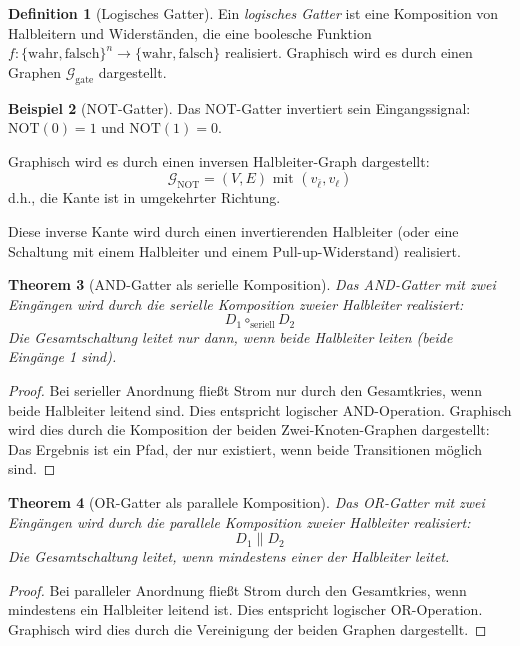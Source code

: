 \documentclass[12pt, a4paper]{article}
\newtheorem{theorem}{Theorem}[section]
\theoremstyle{definition}
\newtheorem{definition}[theorem]{Definition}
\newtheorem{example}[theorem]{Beispiel}
\theoremstyle{remark}
\newcommand{\Bool}{\{\mathrm{wahr}, \mathrm{falsch}\}}
\newcommand{\Graph}{\mathcal{G}}
\newcommand{\leit}{\ell}
\newcommand{\sperr}{\bar{\ell}}
\begin{document}
\begin{definition}[Logisches Gatter]
\label{def:logisches_gatter}
Ein \emph{logisches Gatter} ist eine Komposition von Halbleitern und Widerständen, die eine boolesche Funktion $f: \Bool^n \to \Bool$ realisiert. Graphisch wird es durch einen Graphen $\Graph_{\mathrm{gate}}$ dargestellt.
\end{definition}

\begin{example}[NOT-Gatter]
\label{ex:not_gatter}
Das NOT-Gatter invertiert sein Eingangssignal: $\mathrm{NOT}(0) = 1$ und $\mathrm{NOT}(1) = 0$.

Graphisch wird es durch einen inversen Halbleiter-Graph dargestellt:
\[
  \Graph_{\mathrm{NOT}} = (V, E) \text{ mit } (v_{\sperr}, v_{\leit})
\]
d.h., die Kante ist in umgekehrter Richtung.

Diese inverse Kante wird durch einen invertierenden Halbleiter (oder eine Schaltung mit einem Halbleiter und einem Pull-up-Widerstand) realisiert.
\end{example}

\begin{theorem}[AND-Gatter als serielle Komposition]
\label{thm:and_gatter}
Das AND-Gatter mit zwei Eingängen wird durch die serielle Komposition zweier Halbleiter realisiert:
\[
  D_1 \circ_{\mathrm{seriell}} D_2
\]
Die Gesamtschaltung leitet nur dann, wenn beide Halbleiter leiten (beide Eingänge 1 sind).
\end{theorem}

\begin{proof}
Bei serieller Anordnung fließt Strom nur durch den Gesamtkries, wenn beide Halbleiter leitend sind. Dies entspricht logischer AND-Operation. Graphisch wird dies durch die Komposition der beiden Zwei-Knoten-Graphen dargestellt: Das Ergebnis ist ein Pfad, der nur existiert, wenn beide Transitionen möglich sind.
\end{proof}

\begin{theorem}[OR-Gatter als parallele Komposition]
\label{thm:or_gatter}
Das OR-Gatter mit zwei Eingängen wird durch die parallele Komposition zweier Halbleiter realisiert:
\[
  D_1 \parallel D_2
\]
Die Gesamtschaltung leitet, wenn mindestens einer der Halbleiter leitet.
\end{theorem}

\begin{proof}
Bei paralleler Anordnung fließt Strom durch den Gesamtkries, wenn mindestens ein Halbleiter leitend ist. Dies entspricht logischer OR-Operation. Graphisch wird dies durch die Vereinigung der beiden Graphen dargestellt.
\end{proof}
\end{document}
